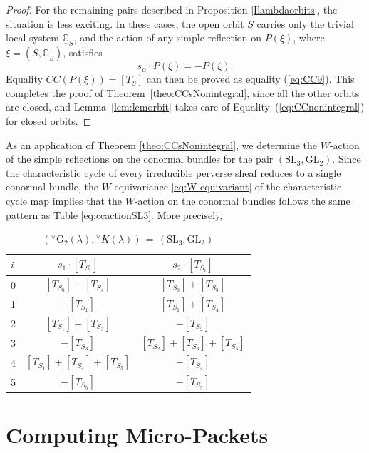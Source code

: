 \documentclass[a4paper, 11pt]{article}
\begin{document}
\begin{proof}
For the remaining pairs described in Proposition \ref{Ilambdaorbits},
the situation is less exciting. In these cases, the open orbit $S$
carries only the trivial local system $\underline{\mathbb{C}}_S$, and
the action of any simple reflection on  $P(\xi)$, where
$\xi=(S,\underline{\mathbb{C}}_S)$, satisfies  
$$s_\alpha\cdot P(\xi)=-P(\xi).$$
Equality $CC(P(\xi))=[T_S]$ can then be proved as equality (\ref{eq:CC9}).
This completes the proof of Theorem~\ref{theo:CCsNonintegral},
since all the other orbits are closed, and Lemma~\ref{lem:lemorbit}
takes care of Equality~(\ref{eq:CCnonintegral}) for closed orbits.
\end{proof}

As an application of Theorem \ref{theo:CCsNonintegral}, we determine
the $W$-action of the simple reflections on the conormal bundles for
the pair $(\mathrm{SL}_3,\mathrm{GL}_2)$.
Since the characteristic cycle of every irreducible perverse sheaf 
reduces to a single conormal bundle, the $W$-equivariance
\eqref{eq:W-equivariant}  of the characteristic cycle map implies that
the $W$-action  on the conormal bundles follows the same pattern as
Table \ref{eq:ccactionSL3}. More precisely,
\begin{table}[!htb]
\centering   
    \begin{minipage}{.5\linewidth}
       \caption{$\left({}^{\vee}\mathrm{G}_{2}(\lambda),{}^{\vee}K(\lambda)\right)\, =\, (\mathrm{SL}_3,\mathrm{GL}_2)$      
      }
      \centering
\begin{tabular}{ | l | c | c | }
\hline 
 $i$ & $s_{1}\cdot [T_{S_i}]$ & $s_{2}\cdot [T_{S_i}]$ \\ \hline \hline		
   0 & $[T_{S_0}] + [T_{S_4}]$ & $[T_{S_0}] + [T_{S_3}]$\\	\hline
   1 & $-[T_{S_1}]$ & $[T_{S_1}] + [T_{S_4}]$ \\ \hline
   2 & $[T_{S_1}] + [T_{S_3}]$ & $-[T_{S_2}]$ \\ \hline
   3 & $-[T_{S_3}]$ & $[T_{S_2}] + [T_{S_3}] + [T_{S_5}]$ \\ \hline
   4 & $[T_{S_1}] + [T_{S_4}] + [T_{S_5}]$ & $-[T_{S_4}]$\\ \hline
   5 & $-[T_{S_5}]$ & $-[T_{S_5}]$\\ 
 \hline  
\end{tabular}
          \end{minipage}
    \end{table}
 

\section{Computing Micro-Packets}
\end{document}
